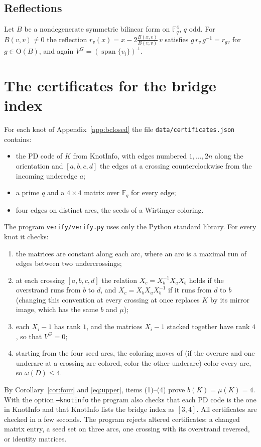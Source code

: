 \documentclass[11pt]{amsart}
\theoremstyle{definition}
\theoremstyle{remark}
\numberwithin{equation}{section}
\newcommand{\F}{\mathbb{F}}
\renewcommand{\O}{\mathrm{O}}
\begin{document}
\subsection*{Reflections}
Let $B$ be a nondegenerate symmetric bilinear form on $\F_q^4$, $q$ odd. For $B(v,v)\ne0$
the reflection $r_v(x)=x-2\frac{B(x,v)}{B(v,v)}\,v$ satisfies $g\,r_v\,g^{-1}=r_{gv}$ for
$g\in\O(B)$, and again $V^G=(\operatorname{span}\{v_i\})^{\perp}$.

\section{The certificates for the bridge index}\label{sec:bcert}

For each knot of Appendix~\ref{app:bclosed} the file \texttt{data/certificates.json}
contains:
\begin{itemize}
\item the PD code of $K$ from KnotInfo, with edges numbered $1,\dots,2n$ along the
orientation and $[a,b,c,d]$ the edges at a crossing counterclockwise from the incoming
underedge $a$;
\item a prime $q$ and a $4\times4$ matrix over $\F_q$ for every edge;
\item four edges on distinct arcs, the seeds of a Wirtinger coloring.
\end{itemize}
The program \texttt{verify/verify.py} uses only the Python standard library. For every
knot it checks:
\begin{enumerate}
\item the matrices are constant along each arc, where an arc is a maximal run of edges
between two undercrossings;
\item at each crossing $[a,b,c,d]$ the relation $X_c=X_b^{-1}X_aX_b$ holds if the
overstrand runs from $b$ to $d$, and $X_c=X_bX_aX_b^{-1}$ if it runs from $d$ to $b$
(changing this convention at every crossing at once replaces $K$ by its mirror image, which
has the same $b$ and $\mu$);
\item each $X_i-1$ has rank $1$, and the matrices $X_i-1$ stacked together have rank $4$,
so that $V^G=0$;
\item starting from the four seed arcs, the coloring moves of \cite{BKVV} (if the overarc
and one underarc at a crossing are colored, color the other underarc) color every arc, so
$\omega(D)\le4$.
\end{enumerate}
By Corollary~\ref{cor:four} and \eqref{eq:upper}, items (1)--(4) prove $b(K)=\mu(K)=4$.
With the option \texttt{--knotinfo} the program also checks that each PD code is the one
in KnotInfo and that KnotInfo lists the bridge index as $[3,4]$. All \bclosed{}
certificates are checked in a few seconds. The program rejects altered certificates: a
changed matrix entry, a seed set on three arcs, one crossing with its overstrand reversed,
or identity matrices.
\end{document}

